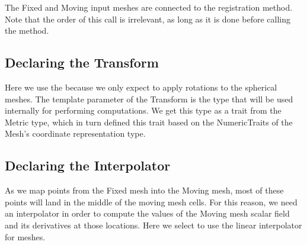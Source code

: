 \documentclass{InsightArticle}
\begin{document}
The Fixed and Moving input meshes are connected to the registration method.
Note that the order of this call is irrelevant, as long as it is done before
calling the  method.

\begin{center}

\end{center}

\subsection{Declaring the Transform}

Here we use the  because we only expect to apply
rotations to the spherical meshes. The template parameter of the Transform is
the type that will be used internally for performing computations. We get this
type as a trait from the Metric type, which in turn defined this trait based on
the NumericTraits of the Mesh's coordinate representation type.

\begin{center}

\end{center}


\subsection{Declaring the Interpolator}

As we map points from the Fixed mesh into the Moving mesh, most of these points
will land in the middle of the moving mesh cells. For this reason, we need an
interpolator in order to compute the values of the Moving mesh scalar field and
its derivatives at those locations. Here we select to use the linear
interpolator for meshes.

\begin{center}

\end{center}


%
%



\end{document}
